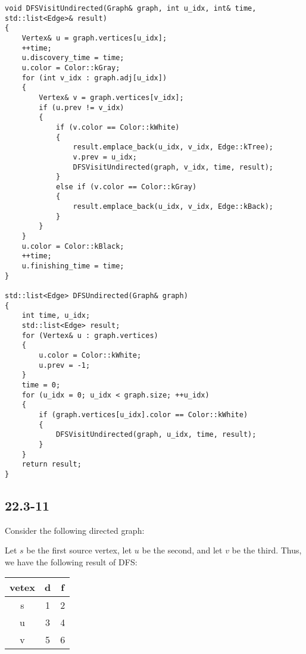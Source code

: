 \begin{verbatim}
void DFSVisitUndirected(Graph& graph, int u_idx, int& time, std::list<Edge>& result)
{
    Vertex& u = graph.vertices[u_idx];
    ++time;
    u.discovery_time = time;
    u.color = Color::kGray;
    for (int v_idx : graph.adj[u_idx])
    {
        Vertex& v = graph.vertices[v_idx];
        if (u.prev != v_idx)
        {
            if (v.color == Color::kWhite)
            {
                result.emplace_back(u_idx, v_idx, Edge::kTree);
                v.prev = u_idx;
                DFSVisitUndirected(graph, v_idx, time, result);
            }
            else if (v.color == Color::kGray)
            {
                result.emplace_back(u_idx, v_idx, Edge::kBack);
            }
        }
    }
    u.color = Color::kBlack;
    ++time;
    u.finishing_time = time;
}

std::list<Edge> DFSUndirected(Graph& graph)
{
    int time, u_idx;
    std::list<Edge> result;
    for (Vertex& u : graph.vertices)
    {
        u.color = Color::kWhite;
        u.prev = -1;
    }
    time = 0;
    for (u_idx = 0; u_idx < graph.size; ++u_idx)
    {
        if (graph.vertices[u_idx].color == Color::kWhite)
        {
            DFSVisitUndirected(graph, u_idx, time, result);
        }
    }
    return result;
}
\end{verbatim}

\subsection*{22.3-11}

Consider the following directed graph:


Let $s$ be the first source vertex, 
let $u$ be the second,
and let $v$ be the third.
Thus, we have the following result of DFS:

\begin{tabular}{c|c|c}
    vetex & d & f \\
    \hline
    s & 1 & 2 \\
    u & 3 & 4 \\
    v & 5 & 6
\end{tabular}

